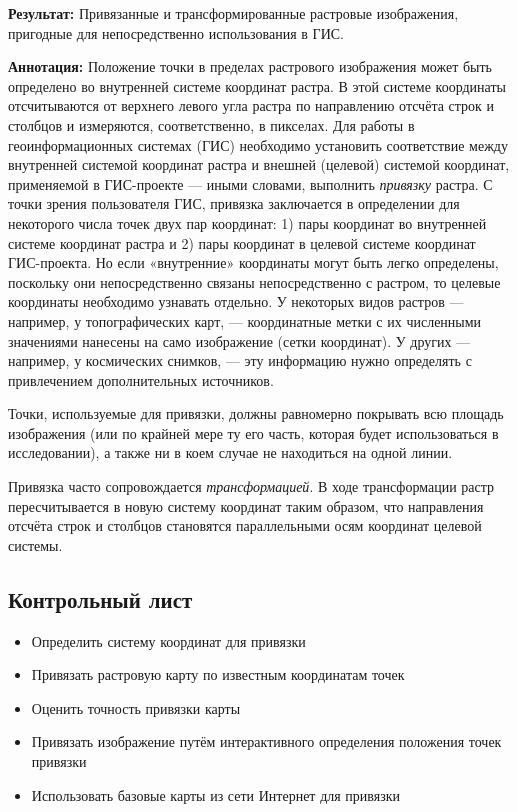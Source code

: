 \documentclass[
  12pt,
]{book}
\providecommand{\tightlist}{%
  \setlength{\itemsep}{0pt}\setlength{\parskip}{0pt}}
\begin{document}
\textbf{Результат:} Привязанные и трансформированные растровые изображения, пригодные для непосредственно использования в ГИС.

\textbf{Аннотация:} Положение точки в пределах растрового изображения может быть определено во внутренней системе координат растра. В этой системе координаты отсчитываются от верхнего левого угла растра по направлению отсчёта строк и столбцов и измеряются, соответственно, в пикселах. Для работы в геоинформационных системах (ГИС) необходимо установить соответствие между внутренней системой координат растра и внешней (целевой) системой координат, применяемой в ГИС-проекте --- иными словами, выполнить \emph{привязку} растра. С точки зрения пользователя ГИС, привязка заключается в определении для некоторого числа точек двух пар координат: 1) пары координат во внутренней системе координат растра и 2) пары координат в целевой системе координат ГИС-проекта. Но если «внутренние» координаты могут быть легко определены, поскольку они непосредственно связаны непосредственно с растром, то целевые координаты необходимо узнавать отдельно. У некоторых видов растров --- например, у топографических карт, --- координатные метки с их численными значениями нанесены на само изображение (сетки координат). У других --- например, у космических снимков, --- эту информацию нужно определять с привлечением дополнительных источников.

Точки, используемые для привязки, должны равномерно покрывать всю площадь изображения (или по крайней мере ту его часть, которая будет использоваться в исследовании), а также ни в коем случае не находиться на одной линии.

Привязка часто сопровождается \emph{трансформацией}. В ходе трансформации растр пересчитывается в новую систему координат таким образом, что направления отсчёта строк и столбцов становятся параллельными осям координат целевой системы.

\hypertarget{raster-reference-control}{%
\subsection{Контрольный лист}\label{raster-reference-control}}

\begin{itemize}
\tightlist
\item
  Определить систему координат для привязки
\item
  Привязать растровую карту по известным координатам точек
\item
  Оценить точность привязки карты
\item
  Привязать изображение путём интерактивного определения положения точек привязки
\item
  Использовать базовые карты из сети Интернет для привязки
\end{itemize}
\end{document}
